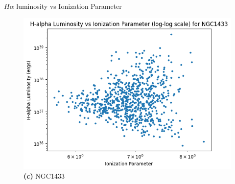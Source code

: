 \documentclass{beamer}
\begin{document}
\begin{frame}{$H\alpha$ luminosity vs Ionization Parameter}
    \begin{figure}[H]
        \centering
        \includegraphics[scale = 0.25]{image7.png}
        \caption*{\textbf{(c)} NGC1433}
        \label{fig:image7}
    \end{figure}
\end{frame}
\end{document}
